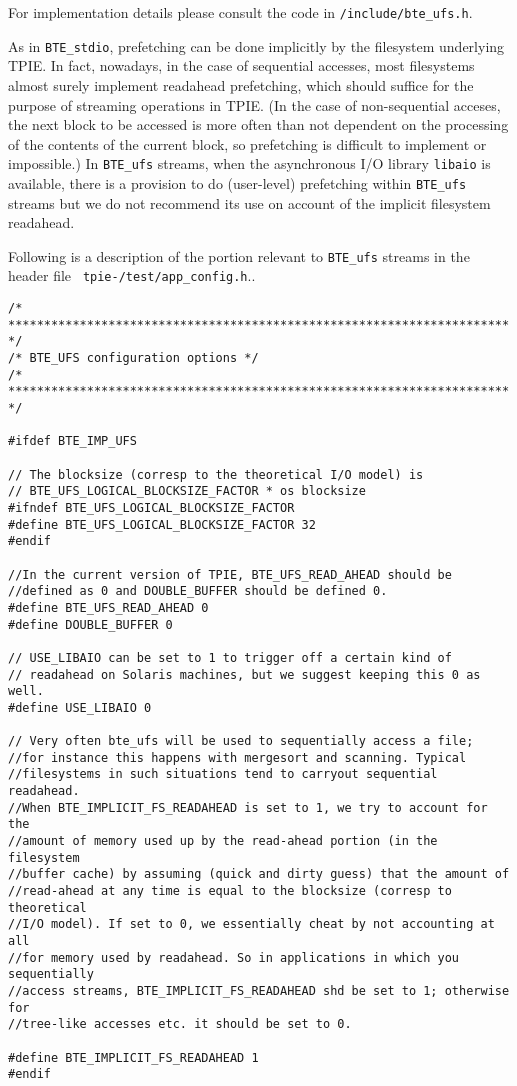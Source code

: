 For implementation details please consult the code in
\verb|/include/bte_ufs.h|.

As in  \verb|BTE_stdio|, prefetching can be done implicitly by the
filesystem underlying TPIE. In fact, nowadays, in the case of 
sequential accesses, most filesystems almost surely implement
readahead prefetching, which should suffice for the purpose of
streaming operations in TPIE. (In the case of non-sequential acceses,
the next block to be accessed is more often than not dependent on
the processing of the contents of the current block, so prefetching
is difficult to implement or impossible.) In \verb|BTE_ufs|
streams, when the asynchronous I/O library {\tt libaio} is available, there is a provision
to do (user-level) prefetching within \verb|BTE_ufs| streams but we
do not recommend its use on account of the implicit filesystem readahead.


Following is a description of the portion relevant to  \verb|BTE_ufs|
streams in  the header file {\tt
tpie-\version/test/app\_config.h}..


\begin{verbatim}
/* ********************************************************************** */
/* BTE_UFS configuration options */
/* ********************************************************************** */

#ifdef BTE_IMP_UFS

// The blocksize (corresp to the theoretical I/O model) is 
// BTE_UFS_LOGICAL_BLOCKSIZE_FACTOR * os blocksize 
#ifndef BTE_UFS_LOGICAL_BLOCKSIZE_FACTOR
#define BTE_UFS_LOGICAL_BLOCKSIZE_FACTOR 32
#endif

//In the current version of TPIE, BTE_UFS_READ_AHEAD should be
//defined as 0 and DOUBLE_BUFFER should be defined 0. 
#define BTE_UFS_READ_AHEAD 0
#define DOUBLE_BUFFER 0

// USE_LIBAIO can be set to 1 to trigger off a certain kind of 
// readahead on Solaris machines, but we suggest keeping this 0 as well.
#define USE_LIBAIO 0

// Very often bte_ufs will be used to sequentially access a file;
//for instance this happens with mergesort and scanning. Typical
//filesystems in such situations tend to carryout sequential readahead.
//When BTE_IMPLICIT_FS_READAHEAD is set to 1, we try to account for the
//amount of memory used up by the read-ahead portion (in the filesystem
//buffer cache) by assuming (quick and dirty guess) that the amount of
//read-ahead at any time is equal to the blocksize (corresp to theoretical
//I/O model). If set to 0, we essentially cheat by not accounting at all
//for memory used by readahead. So in applications in which you sequentially
//access streams, BTE_IMPLICIT_FS_READAHEAD shd be set to 1; otherwise for
//tree-like accesses etc. it should be set to 0.

#define BTE_IMPLICIT_FS_READAHEAD 1
#endif
\end{verbatim}



